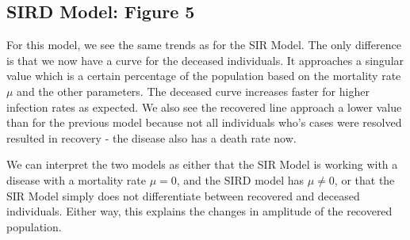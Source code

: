 \documentclass[12pt]{article}
\begin{document}
\subsection{SIRD Model: Figure 5}
For this model, we see the same trends as for the SIR Model. The only difference is that we now have a curve for the deceased individuals. It approaches a singular value which is a certain percentage of the population based on the mortality rate $\mu$ and the other parameters. The deceased curve increases faster for higher infection rates as expected. We also see the recovered line approach a lower value than for the previous model because not all individuals who's cases were resolved resulted in recovery - the disease also has a death rate now. 

We can interpret the two models as either that the SIR Model is working with a disease with a mortality rate $\mu=0$, and the SIRD model has $\mu \neq 0$, or that the SIR Model simply does not differentiate between recovered and deceased individuals. Either way, this explains the changes in amplitude of the recovered population. 
\end{document}

